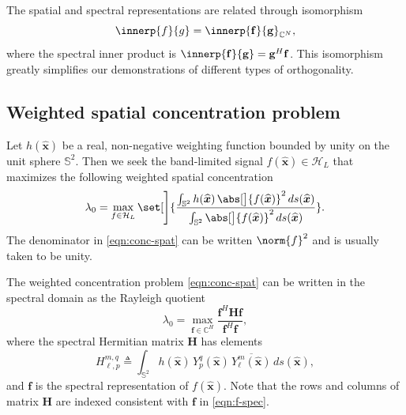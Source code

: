 \documentclass[10pt, twocolumn, twoside]{IEEEtran}
\newcommand{\untsph}{\mathbb{S}^{2}} %
\newcommand{\unit}[1]{\widehat{\bm{#1}}}
\newcommand{\cmplx}{\mathbb{C}} %
\newcommand{\dfn}{\triangleq}
\newcommand{\conj}[1]{\overline{#1}} %
\begin{document}
The spatial and spectral representations are related through isomorphism\cite{Kennedy-book:2013}
\begin{equation}
\label{eqn:isom}
	\innerp{f}{g}=\innerp{\mathbf{f}}{\mathbf{g}}_{\cmplx^N},
\end{equation}
where the spectral inner product is $\innerp{\mathbf{f}}{\mathbf{g}}=\mathbf{g}^H\mathbf{f}$.
This isomorphism greatly simplifies our demonstrations of different types of orthogonality.

\subsection{Weighted spatial concentration problem}

Let $h(\unit{x})$ be a real, non-negative weighting function bounded by unity on the unit sphere $\untsph$.  Then we seek the band-limited signal $f(\unit{x})\in\mathcal{H}_{L}$ that maximizes the following weighted spatial concentration
\begin{equation}
\label{eqn:conc-spat}
	\lambda_0
		=\max_{f\in\mathcal{H}_{L}}
		\set[\Bigg]{\frac{\int_{\untsph} h(\unit{x})\,\abs[\big]{f(\unit{x})}^2\,ds(\unit{x})}%
		{\int_{\untsph} \abs[\big]{f(\unit{x})}^2\,ds(\unit{x})}}.
\end{equation}
The denominator in \eqref{eqn:conc-spat} can be written $\norm{f}^2$ and is usually taken to be unity.

The weighted concentration problem \eqref{eqn:conc-spat} can be written in the spectral domain as the Rayleigh quotient
\begin{equation}
\label{eqn:conc-spec}
	\lambda_0
		=\max_{\mathbf{f}\in\cmplx^{H}}\frac{\mathbf{f}^H\mathbf{H}\mathbf{f}}%
		{\mathbf{f}^H\mathbf{f}},
\end{equation}
where the spectral Hermitian matrix $\mathbf{H}$ has elements
\begin{equation}
\label{eqn:W-matrix}
	H_{\ell,p}^{m,q} \dfn \int_{\untsph} h(\unit{x})\,Y_{p}^{q}(\unit{x})\,
		\conj{Y_{\ell}^{m}(\unit{x})}\,ds(\unit{x}),
\end{equation}
and $\mathbf{f}$ is the spectral representation of $f(\unit{x})$.  Note that the rows and columns of matrix $\mathbf{H}$ are indexed consistent with $\mathbf{f}$ in \eqref{eqn:f-spec}.
\end{document}
